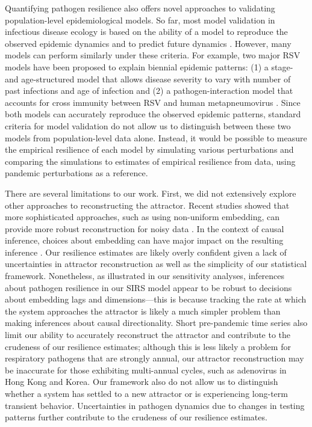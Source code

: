 \documentclass[12pt]{article}
\begin{document}
Quantifying pathogen resilience also offers novel approaches to validating population-level epidemiological models.
So far, most model validation in infectious disease ecology is based on the ability of a model to reproduce the observed epidemic dynamics and to predict future dynamics \citep{grenfell2002dynamics,bhattacharyya2015cross,pitzer2015environmental,dean2018human,pons2018serotype}.
However, many models can perform similarly under these criteria.
For example, two major RSV models have been proposed to explain biennial epidemic patterns: (1) a stage- and age-structured model that allows disease severity to vary with number of past infections and age of infection \citep{pitzer2015environmental} and (2) a pathogen-interaction model that accounts for cross immunity between RSV and human metapneumovirus \citep{bhattacharyya2015cross}.
Since both models can accurately reproduce the observed epidemic patterns, standard criteria for model validation do not allow us to distinguish between these two models from population-level data alone.
Instead, it would be possible to measure the empirical resilience of each model by simulating various perturbations and comparing the simulations to estimates of empirical resilience from data, using pandemic perturbations as a reference.

There are several limitations to our work.
First, we did not extensively explore other approaches to reconstructing the attractor.
Recent studies showed that more sophisticated approaches, such as using non-uniform embedding, can provide more robust reconstruction for noisy data \citep{tan2023selecting}.
In the context of causal inference, choices about embedding can have major impact on the resulting inference \citep{cobey2016limits}.
Our resilience estimates are likely overly confident given a lack of uncertainties in attractor reconstruction as well as the simplicity of our statistical framework.
Nonetheless, as illustrated in our sensitivity analyses, inferences about pathogen resilience in our SIRS model appear to be robust to decisions about embedding lags and dimensions---this is because tracking the rate at which the system approaches the attractor is likely a much simpler problem than making inferences about causal directionality.
Short pre-pandemic time series also limit our ability to accurately reconstruct the attractor and contribute to the crudeness of our resilience estimates;
although this is less likely a problem for respiratory pathogens that are strongly annual, our attractor reconstruction may be inaccurate for those exhibiting multi-annual cycles, such as adenovirus in Hong Kong and Korea.
Our framework also do not allow us to distinguish whether a system has settled to a new attractor or is experiencing long-term transient behavior.
Uncertainties in pathogen dynamics due to changes in testing patterns further contribute to the crudeness of our resilience estimates.
\end{document}
